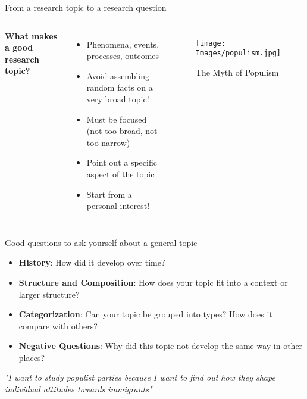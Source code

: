 \documentclass[10pt, aspectratio=169]{beamer}
\begin{document}
\begin{frame}{From a research topic to a research question}
\begin{columns}
\textbf{What makes a good research topic?} \vspace{0.2cm}
\begin{itemize}
\item Phenomena, events, processes, outcomes \vspace{0.2cm}
\item Avoid assembling random facts on a very broad topic! \vspace{0.2cm}
\item Must be focused (not too broad, not too narrow) \vspace{0.2cm}
\item Point out a specific aspect of the topic \vspace{0.2cm}
\item Start from a personal interest! 
\end{itemize}
\begin{figure}
\centering
\texttt{[image: Images/populism.jpg]}
\caption{The Myth of Populism}
\label{fig:enter-label}
\end{figure}
\end{columns}
\end{frame}


\begin{frame}{Good questions to ask yourself about a general topic}
\begin{itemize}
    \item \textbf{History}: How did it develop over time? \vspace{0.3cm}
    \item \textbf{Structure and Composition}: How does your topic fit into a context or larger structure? \vspace{0.3cm}
    \item \textbf{Categorization}: Can your topic be grouped into types? How does it compare with others?\vspace{0.3cm}
    \item \textbf{Negative Questions}: Why did this topic not develop the same way in other places? \vspace{0.4cm}
\end{itemize}
\begin{center}
\textit{"I want to study populist parties because I want to find out how they shape individual attitudes towards immigrants"} 
\end{center}
\end{frame}
\end{document}
